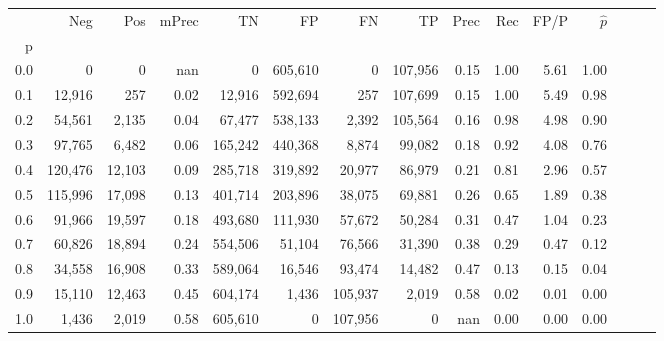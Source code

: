 \begin{tabular}{rrrrrrrrrrrrrrr}
\toprule
{} &      Neg &     Pos & mPrec &       TN &       FP &       FN &       TP &  Prec &   Rec &  FP/P & $\hat{p}$ \\
p   &          &         &       &          &          &          &          &       &       &       &           \\
\midrule
0.0 &        0 &       0 &   nan &        0 &  605,610 &        0 &  107,956 &  0.15 &  1.00 &  5.61 &      1.00 \\
0.1 &   12,916 &     257 &  0.02 &   12,916 &  592,694 &      257 &  107,699 &  0.15 &  1.00 &  5.49 &      0.98 \\
0.2 &   54,561 &   2,135 &  0.04 &   67,477 &  538,133 &    2,392 &  105,564 &  0.16 &  0.98 &  4.98 &      0.90 \\
0.3 &   97,765 &   6,482 &  0.06 &  165,242 &  440,368 &    8,874 &   99,082 &  0.18 &  0.92 &  4.08 &      0.76 \\
0.4 &  120,476 &  12,103 &  0.09 &  285,718 &  319,892 &   20,977 &   86,979 &  0.21 &  0.81 &  2.96 &      0.57 \\
0.5 &  115,996 &  17,098 &  0.13 &  401,714 &  203,896 &   38,075 &   69,881 &  0.26 &  0.65 &  1.89 &      0.38 \\
0.6 &   91,966 &  19,597 &  0.18 &  493,680 &  111,930 &   57,672 &   50,284 &  0.31 &  0.47 &  1.04 &      0.23 \\
0.7 &   60,826 &  18,894 &  0.24 &  554,506 &   51,104 &   76,566 &   31,390 &  0.38 &  0.29 &  0.47 &      0.12 \\
0.8 &   34,558 &  16,908 &  0.33 &  589,064 &   16,546 &   93,474 &   14,482 &  0.47 &  0.13 &  0.15 &      0.04 \\
0.9 &   15,110 &  12,463 &  0.45 &  604,174 &    1,436 &  105,937 &    2,019 &  0.58 &  0.02 &  0.01 &      0.00 \\
1.0 &    1,436 &   2,019 &  0.58 &  605,610 &        0 &  107,956 &        0 &   nan &  0.00 &  0.00 &      0.00 \\
\bottomrule
\end{tabular}
